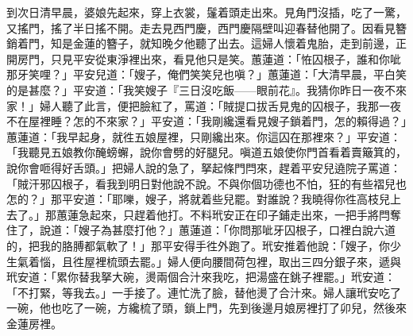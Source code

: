 到次日清早晨，婆娘先起來，穿上衣裳，鬔着頭走出來。見角門沒插，吃了一驚，又搖門，搖了半日搖不開。走去見西門慶，西門慶隔壁叫迎春替他開了。因看見簪銷着門，知是金蓮的簪子，就知晚夕他聽了出去。這婦人懷着鬼胎，走到前邊，正開房門，只見平安從東淨裡出來，看見他只是笑。蕙蓮道：「恠囚根子，誰和你呲那牙笑哩？」平安兒道：「嫂子，俺們笑笑兒也嗔？」蕙蓮道：「大清早晨，平白笑的是甚麼？」平安道：「我笑嫂子『三日沒吃飯——眼前花』。我猜你昨日一夜不來家！」{}婦人聽了此言，便把臉紅了，罵道：「賊提口拔舌見鬼的囚根子，我那一夜不在屋裡睡？怎的不來家？」平安道：「我剛纔還看見嫂子鎖着門，怎的賴得過？」蕙蓮道：「我早起身，就徃五娘屋裡，只剛纔出來。你這囚在那裡來？」平安道：「我聽見五娘教你醃螃蠏，說你會劈的好腿兒。嗔道五娘使你門首看着賣簸箕的，說你會咂得好舌頭。」{}把婦人說的急了，拏起條門閂來，趕着平安兒遶院子罵道：「賊汗邪囚根子，看我到明日對他說不說。不與你個功德也不怕，狂的有些褶兒也怎的？」那平安道：「耶嚛，嫂子，將就着些兒罷。對誰說？{}我曉得你徃高枝兒上去了。」那蕙蓮急起來，只趕着他打。不料玳安正在印子鋪走出來，一把手將閂奪住了，說道：「嫂子為甚麼打他？」蕙蓮道：「你問那呲牙囚根子，口裡白說六道的，把我的胳膊都氣軟了！」那平安得手徃外跑了。玳安推着他說：「嫂子，你少生氣着惱，且徃屋裡梳頭去罷。」婦人便向腰間荷包裡，取出三四分銀子來，遞與玳安道：「累你替我拏大碗，燙兩個合汁來我吃，把湯盛在銚子裡罷。」{}玳安道：「不打緊，等我去。」一手接了。連忙洗了臉，替他燙了合汁來。婦人讓玳安吃了一碗，他也吃了一碗，方纔梳了頭，鎖上門，先到後邊月娘房裡打了卯兒，然後來金蓮房裡。

